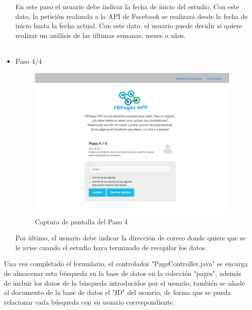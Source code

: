 \begin{itemize}
\begin{figure}[H]
\end{figure}
En este paso el usuario debe indicar la fecha de inicio del estudio. Con este dato, la petición realizada a la API de Facebook se realizará desde la fecha de inicio hasta la fecha actual. Con este dato, el usuario puede decidir si quiere realizar un análisis de las últimas semanas, meses o años. \\
\\
\item Paso 4/4 \\
\begin{figure}[H]
\centering
\includegraphics[width=5in]{figuras/paso4.png}
\caption{Captura de pantalla del Paso 4} \label{fig:paso4}
\end{figure}
Por último, el usuario debe indicar la dirección de correo donde quiere que se le avise cuando el estudio haya terminado de recopilar los datos. 
\end{itemize}

Una vez completado el formulario, el controlador "PageController.java" se encarga de almacenar esta búsqueda en la base de datos en la colección "pages", además de incluir los datos de la búsqueda introducidos por el usuario, también se añade al documento de la base de datos el "ID" del usuario, de forma que se pueda relacionar cada búsqueda con su usuario correspondiente. 

